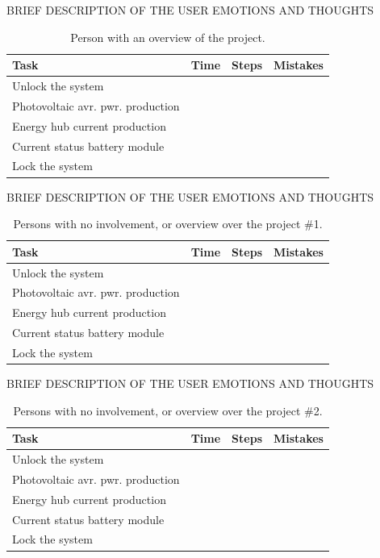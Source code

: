 BRIEF DESCRIPTION OF THE USER EMOTIONS AND THOUGHTS\\

\begin{table}[!h]
\begin{tabular}{ | l | l | l | l |}
	\hline
	Task & Time & Steps & Mistakes \\ \hline
	Unlock the system & & & \\ \hline
	Photovoltaic avr. pwr. production & & & \\ \hline
	Energy hub current production & & & \\ \hline
	Current status battery module & & & \\ \hline
	Lock the system & & & \\ \hline
\end{tabular}
\caption{Person with an overview of the project.}
\end{table}

BRIEF DESCRIPTION OF THE USER EMOTIONS AND THOUGHTS\\

\begin{table}[!h]
\begin{tabular}{ | l | l | l | l |}
	\hline
	Task & Time & Steps & Mistakes \\ \hline
	Unlock the system & & & \\ \hline
	Photovoltaic avr. pwr. production & & & \\ \hline
	Energy hub current production & & & \\ \hline
	Current status battery module & & & \\ \hline
	Lock the system & & & \\ \hline
\end{tabular}
\caption{Persons with no involvement, or overview over the project \#1.}
\end{table}

BRIEF DESCRIPTION OF THE USER EMOTIONS AND THOUGHTS\\

\begin{table}[!h]
\begin{tabular}{ | l | l | l | l |}
	\hline
	Task & Time & Steps & Mistakes \\ \hline
	Unlock the system & & & \\ \hline
	Photovoltaic avr. pwr. production & & & \\ \hline
	Energy hub current production & & & \\ \hline
	Current status battery module & & & \\ \hline
	Lock the system & & & \\ \hline
\end{tabular}
\caption{Persons with no involvement, or overview over the project \#2.}
\end{table}


